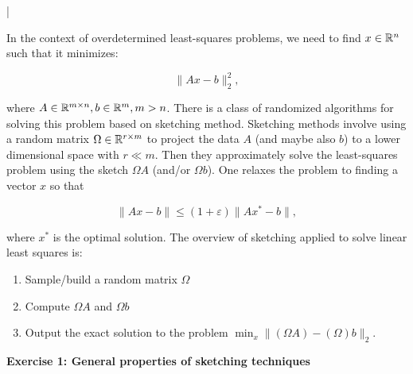 \documentclass[11pt]{article}
\begin{document}
\lstset{frameround=fttt,language=Matlab}

\lstMakeShortInline[columns=fixed]|


In the context of overdetermined least-squares problems, we need to find $x \in \mathbb{R}^n$ such that it minimizes:

\[ \|Ax - b\|_2^2, \]

where $A \in \mathbb{R}^{m \times n}, b \in \mathbb{R}^{m}, m > n$. There is a class of randomized algorithms for solving this problem based on sketching method. Sketching methods involve using a random matrix $\Omega \in \mathbb{R}^{r \times m}$ to project the data $A$ (and maybe also $b$) to a lower dimensional space with $r \ll m$. Then they approximately solve the least-squares problem using the sketch $\Omega A$ (and/or $\Omega b$).  One relaxes the problem to finding a vector $x$ so that 

\[ \|Ax - b\| \leq (1 + \varepsilon)\|Ax^* - b\|, \]

where $x^*$ is the optimal solution. The overview of sketching applied to solve linear least squares is:

\begin{enumerate}
    \item Sample/build a random matrix $\Omega$
    \item Compute $\Omega A$ and $\Omega b$
    \item Output the exact solution to the problem $\min_{x} \| (\Omega A) - (\Omega) b\|_2$.
\end{enumerate}

{\bf{Exercise 1: General properties of sketching techniques}}\\
\end{document}
